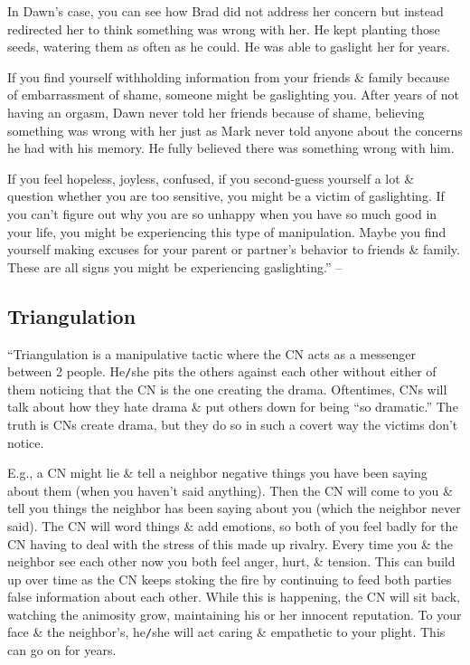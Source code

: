 \documentclass{article}
\numberwithin{equation}{section}
\begin{document}
In Dawn's case, you can see how Brad did not address her concern but instead redirected her to think something was wrong with her. He kept planting those seeds, watering them as often as he could. He was able to gaslight her for years.

If you find yourself withholding information from your friends \& family because of embarrassment of shame, someone might be gaslighting you. After years of not having an orgasm, Dawn never told her friends because of shame, believing something was wrong with her just as Mark never told anyone about the concerns he had with his memory. He fully believed there was something wrong with him.

If you feel hopeless, joyless, confused, if you second-guess yourself a lot \& question whether you are too sensitive, you might be a victim of gaslighting. If you can't figure out why you are so unhappy when you have so much good in your life, you might be experiencing this type of manipulation. Maybe you find yourself making excuses for your parent or partner's behavior to friends \& family. These are all signs you might be experiencing gaslighting.'' -- \cite[pp. 73--75]{Mirza2017}

\subsection{Triangulation}
``Triangulation is a manipulative tactic where the CN acts as a messenger between 2 people. He\texttt{/}she pits the others against each other without either of them noticing that the CN is the one creating the drama. Oftentimes, CNs will talk about how they hate drama \& put others down for being ``so dramatic.'' The truth is CNs create drama, but they do so in such a covert way the victims don't notice.

E.g., a CN might lie \& tell a neighbor negative things you have been saying about them (when you haven't said anything). Then the CN will come to you \& tell you things the neighbor has been saying about you (which the neighbor never said). The CN will word things \& add emotions, so both of you feel badly for the CN having to deal with the stress of this made up rivalry. Every time you \& the neighbor see each other now you both feel anger, hurt, \& tension. This can build up over time as the CN keeps stoking the fire by continuing to feed both parties false information about each other. While this is happening, the CN will sit back, watching the animosity grow, maintaining his or her innocent reputation. To your face \& the neighbor's, he\texttt{/}she will act caring \& empathetic to your plight. This can go on for years.
\end{document}
